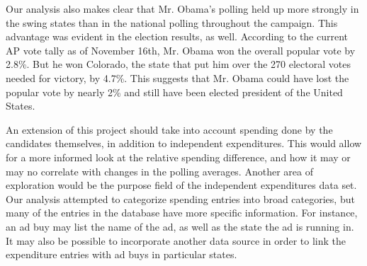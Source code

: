 \documentclass[11pt]{article}\usepackage{graphicx, color}
\begin{document}
Our analysis also makes clear that Mr. Obama's polling held up more strongly in the swing states than in the national polling throughout the campaign. This advantage was evident in the election results, as well. According to the current AP vote tally as of November 16th, Mr. Obama won the overall popular vote by 2.8\%. But he won Colorado, the state that put him over the 270 electoral votes needed for victory, by 4.7\%. This suggests that Mr. Obama could have lost the popular vote by nearly 2\% and still have been elected president of the United States.

An extension of this project should take into account spending done by the candidates themselves, in addition to independent expenditures. This would allow for a more informed look at the relative spending difference, and how it may or may no correlate with changes in the polling averages. Another area of exploration would be the purpose field of the independent expenditures data set. Our analysis attempted to categorize spending entries into broad categories, but many of the entries in the database have more specific information. For instance, an ad buy may list the name of the ad, as well as the state the ad is running in. It may also be possible to incorporate another data source in order to link the expenditure entries with ad buys in particular states.
\end{document}
